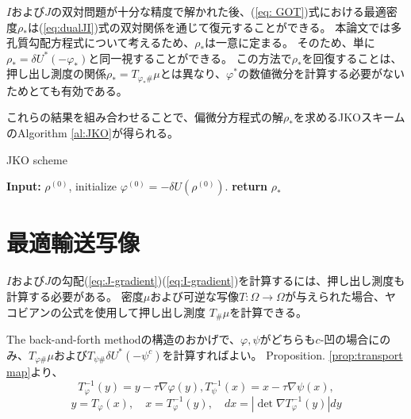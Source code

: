 $I$および$J$の双対問題が十分な精度で解かれた後、(\ref{eq: GOT})式における最適密度\(\rho_*\)は(\ref{eq:dualJI})式の双対関係を通じて復元することができる。
本論文では多孔質勾配方程式について考えるため、$\rho_*$は一意に定まる。
そのため、単に\(\rho_* = \delta U^*(- \varphi_*)\)と同一視することができる。
この方法で\(\rho_*\)を回復することは、押し出し測度の関係\(\rho_* = T_{\varphi_* \# }\mu\)とは異なり、\(\varphi^*\)の数値微分を計算する必要がないためとても有効である。

これらの結果を組み合わせることで、偏微分方程式の解$\rho_*$を求めるJKOスキームのAlgorithm \ref{al:JKO}が得られる。

\begin{algorithm}[tb]
    \caption{JKO scheme}
    \label{al:JKO}
    \begin{algorithmic}
    \State \textbf{Input:} $\rho^{(0)}$, initialize $\varphi^{(0)} = - \delta U(\rho^{(0)}).$
    \EndFor
    \State \textbf{return} $\rho_*$
    \end{algorithmic}
\end{algorithm}


\section{最適輸送写像}
\label{sect:最適輸送写像}

$I$および$J$の勾配(\ref{eq:J-gradient})(\ref{eq:I-gradient})を計算するには、押し出し測度も計算する必要がある。
密度$\mu$および可逆な写像$T: \Omega \to \Omega$が与えられた場合、ヤコビアンの公式を使用して押し出し測度 $T_\# \mu$を計算できる。

The back-and-forth methodの構造のおかげで、$\varphi, \psi$がどちらも$c$-凹の場合にのみ、$T_{\varphi \#} \mu$および$T_{\psi \#} \delta U^*(- \psi^c)$を計算すればよい。
Proposition. \ref{prop:transport map}より、
\[
    T_\varphi ^{-1}(y) = y - \tau \nabla \varphi(y), T_\psi^{-1}(x) = x - \tau \nabla \psi(x),
\]
\[
    y = T_\varphi(x), \quad x = T^{-1}_\varphi (y), \quad dx = |\det \nabla T^{-1}_\varphi (y)| dy 
\]

